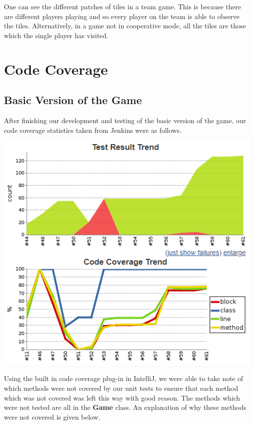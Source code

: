 \documentclass[a4paper,12pt]{extarticle}
\begin{document}
\noindent One can see the different patches of tiles in a team game. This is because there are different players playing and so every player on the team is able to observe the tiles. Alternatively, in a game not in cooperative mode, all the tiles are those which the single player has visited.\\

\newpage 
\section{Code Coverage}
\subsection{Basic Version of the Game}

After finishing our development and testing of the basic version of the game, our code coverage statistics taken from Jenkins were as follows.

\begin{center}
\includegraphics[scale = 0.75]{Figure4.png}\\
\end{center}

\noindent Using the built in code coverage plug-in in IntelliJ, we were able to take note of which methods were not covered by our unit tests to ensure that each method which was not covered was left this way with good reason. The methods which were not tested are all in the \textbf{Game} class. An explanation of why these methods were not covered is given below.
\end{document}
